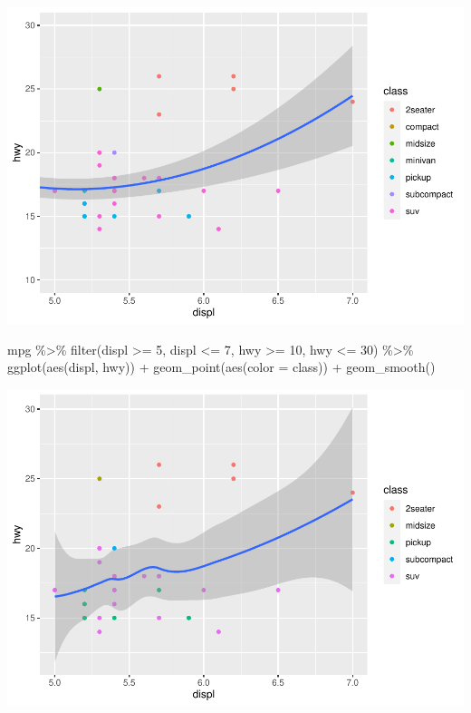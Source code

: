 \documentclass[
]{article}
\newenvironment{Shaded}{\begin{snugshade}}{\end{snugshade}}
\newcommand{\AttributeTok}[1]{\textcolor[rgb]{0.77,0.63,0.00}{#1}}
\newcommand{\DecValTok}[1]{\textcolor[rgb]{0.00,0.00,0.81}{#1}}
\newcommand{\FunctionTok}[1]{\textcolor[rgb]{0.00,0.00,0.00}{#1}}
\newcommand{\NormalTok}[1]{#1}
\newcommand{\SpecialCharTok}[1]{\textcolor[rgb]{0.00,0.00,0.00}{#1}}
\begin{document}
\includegraphics{Journal_files/figure-latex/unnamed-chunk-61-1.pdf}

\begin{Shaded}
\begin{Highlighting}[]
\NormalTok{mpg }\SpecialCharTok{\%\textgreater{}\%}
  \FunctionTok{filter}\NormalTok{(displ }\SpecialCharTok{\textgreater{}=} \DecValTok{5}\NormalTok{, displ }\SpecialCharTok{\textless{}=} \DecValTok{7}\NormalTok{, hwy }\SpecialCharTok{\textgreater{}=} \DecValTok{10}\NormalTok{, hwy }\SpecialCharTok{\textless{}=} \DecValTok{30}\NormalTok{) }\SpecialCharTok{\%\textgreater{}\%}
  \FunctionTok{ggplot}\NormalTok{(}\FunctionTok{aes}\NormalTok{(displ, hwy)) }\SpecialCharTok{+}
  \FunctionTok{geom\_point}\NormalTok{(}\FunctionTok{aes}\NormalTok{(}\AttributeTok{color =}\NormalTok{ class)) }\SpecialCharTok{+}
  \FunctionTok{geom\_smooth}\NormalTok{()}
\end{Highlighting}
\end{Shaded}

\includegraphics{Journal_files/figure-latex/unnamed-chunk-61-2.pdf}
\end{document}
